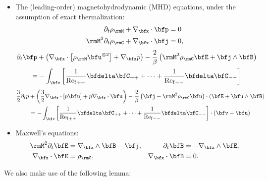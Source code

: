 \begin{enumerate}
\begin{itemize}
            \item  The (leading-order) magnetohydrodynamic (MHD) equations, under the assumption of exact thermalization:
            \begin{align}
                \partial_{t}\rho_{\rmM} + \nabla_{\bfx}\cdot\bfp  &=  0  \label{eqn:mass conservation}  \\
                \rmM^{2}\partial_{t}\rho_{\rmC} + \nabla_{\bfx}\cdot\bfj  &=  0,
            \end{align}
            \vspace{-25pt}
            \begin{multline}
                \partial_{t}\bfp + \left(\nabla_{\bfx}\cdot\left[\rho_{\rmM}\bfu^{\otimes 2}\right] + \nabla_{\bfx}p\right) - \frac{2}{\beta}\left(\rmM^{2}\rho_{\rmC}\bfE + \bfj\wedge\bfB\right)  \\
                =  - \int_{\bfv}\left[\frac{1}{{\rmRef}_{++}}\bfdelta\bfC_{++} + \cdots + \frac{1}{{\rmRef}_{--}}\bfdelta\bfC_{--}\right]
            \end{multline}
            \vspace{-15pt}
            \begin{multline}
                \frac{3}{2}\partial_{t}p + \left(\frac{3}{2}\nabla_{\bfx}\cdot[p\bfu] + p\nabla_{\bfx}\cdot\bfu\right) - \frac{2}{\beta}\left(\bfj - \rmM^{2}\rho_{\rmC}\bfu\right)\cdot(\bfE + \bfu\wedge\bfB)  \\
                =  - \int_{\bfv}\left[\frac{1}{{\rmRef}_{++}}\bfdelta\bfC_{++} + \cdots + \frac{1}{{\rmRef}_{--}}\bfdelta\bfC_{--}\right]\cdot(\bfv - \bfu)  \label{eqn:energy conservation}
            \end{multline}

            \item  Maxwell's equations:
            \begin{align}
                \rmM^{2}\partial_{t}\bfE  &=  \nabla_{\bfx}\wedge\bfB - \bfj,  &
                        \partial_{t}\bfB  &=  - \nabla_{\bfx}\wedge\bfE,  \label{eqn:Maxwell's equations transient}  \\
                  \nabla_{\bfx}\cdot\bfE  &=  \rho_{\rmC},  &
                  \nabla_{\bfx}\cdot\bfB  &=  0.  \label{eqn:Maxwell's equations steady-state}
            \end{align}
        \end{itemize}
    \end{enumerate}

    We also make use of the following lemma:

